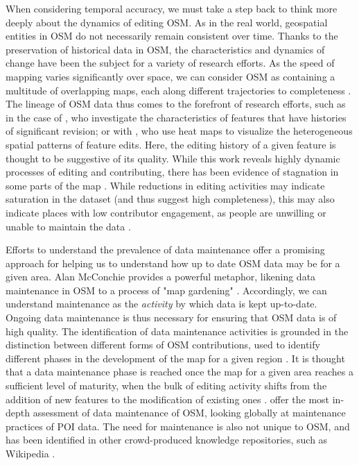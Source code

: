 When considering temporal accuracy, we must take a step back to think more deeply about the dynamics of editing OSM. As in the real world, geospatial entities in OSM do not necessarily remain consistent over time. Thanks to the preservation of historical data in OSM, the characteristics and dynamics of change have been the subject for a variety of research efforts. As the speed of mapping varies significantly over space, we can consider OSM as containing a multitude of overlapping maps, each along different trajectories to completeness \parencite{chuang_one_2013}. The lineage of OSM data thus comes to the forefront of research efforts, such as in the case of \textcite{mooney_characteristics_2012}, who investigate the characteristics of features that have histories of significant revision; or with  \textcite{trame_exploring_2011}, who use heat maps to visualize the heterogeneous spatial patterns of feature edits. Here, the editing history of a given feature is thought to be suggestive of its quality. While this work reveals highly dynamic processes of editing and contributing, there has been evidence of stagnation in some parts of the map \parencite{grochenig_digging_2014}. While reductions in editing activities may indicate saturation in the dataset (and thus suggest high completeness), this may also indicate places with low contributor engagement, as people are unwilling or unable to maintain the data \parencite{grochenig_digging_2014}.

Efforts to understand the prevalence of data maintenance offer a promising approach for helping us to understand how up to date OSM data may be for a given area. Alan McConchie provides a powerful metaphor, likening data maintenance in OSM to a process of "map gardening" \parencite{mcconchie_wiki_2013}. Accordingly, we can understand maintenance as the \textit{activity} by which data is kept up-to-date. Ongoing data maintenance is thus necessary for ensuring that OSM data is of high quality. The identification of data maintenance activities is grounded in the distinction between different forms of OSM contributions, used to identify different phases in the development of the map for a given region \parencite{anderson_crowd_2018}. It is thought that a data maintenance phase is reached once the map for a given area reaches a sufficient level of maturity, when the bulk of editing activity shifts from the addition of new features to the modification of existing ones \parencite{anderson_crowd_2018}. \textcite{quattrone_work_2017} offer the most in-depth assessment of data maintenance of OSM, looking globally at maintenance practices of POI data. The need for maintenance is also not unique to OSM, and has been identified in other crowd-produced knowledge repositories, such as Wikipedia \parencite{kittur_he_2007}. 

